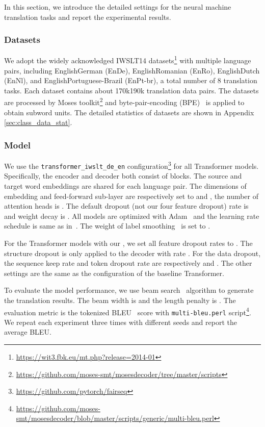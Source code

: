 \documentclass[11pt]{article}
\begin{document}
In this section, we introduce the detailed settings for the neural machine translation tasks and report the experimental results.

\subsubsection{Datasets}
We adopt the widely acknowledged IWSLT14 datasets\footnote{\url{https://wit3.fbk.eu/mt.php?release=2014-01}} with multiple language pairs, including EnglishGerman (EnDe), EnglishRomanian (EnRo), EnglishDutch (EnNl), and EnglishPortuguese-Brazil (EnPt-br), a total number of 8 translation tasks. Each dataset contains about 170k190k translation data pairs. The datasets are processed by Moses toolkit\footnote{\url{https://github.com/moses-smt/mosesdecoder/tree/master/scripts}} and byte-pair-encoding (BPE)~\cite{DBLP:conf/acl/SennrichHB16a} is applied to obtain subword units. The detailed statistics of datasets are shown in Appendix \ref{sec:class_data_stat}.

\subsubsection{Model}
We use the \texttt{transformer\_iwslt\_de\_en} configuration\footnote{\url{https://github.com/pytorch/fairseq}} for all Transformer models. Specifically, the encoder and decoder both consist of  blocks. The source and target word embeddings are shared for each language pair. The dimensions of embedding and feed-forward sub-layer are respectively set to  and , the number of attention heads is . The default dropout (not our four feature dropout) rate is   and weight decay is . All models are optimized with Adam~\cite{DBLP:journals/corr/KingmaB14} and the learning rate schedule is same as in~\citet{vaswani2017attention}. The weight of label smoothing~\cite{DBLP:conf/iclr/PereyraTCKH17} is set to .

For the Transformer models with our , we set all feature dropout rates to . The structure dropout  is only applied to the decoder with rate . For the data dropout, the sequence keep rate  and token dropout rate  are respectively  and . The other settings are the same as the configuration of the baseline Transformer.

To evaluate the model performance, we use beam search~\cite{sutskever2014sequence} algorithm to generate the translation results. The beam width is  and the length penalty is . The evaluation metric is the tokenized BLEU~\cite{DBLP:conf/acl/PapineniRWZ02} score with \texttt{multi-bleu.perl} script\footnote{\url{https://github.com/moses-smt/mosesdecoder/blob/master/scripts/generic/multi-bleu.perl}}. We repeat each experiment three times with different seeds and report the average BLEU.
\end{document}
